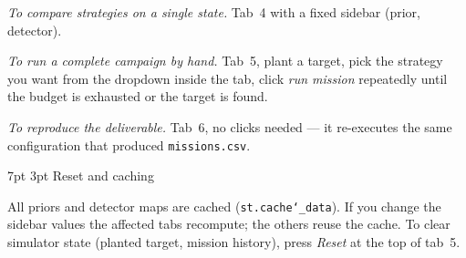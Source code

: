 \documentclass[11pt,a4paper]{article}
\makeatletter
\renewcommand\section{\@startsection{section}{1}{\z@}%
                                    {7pt \@plus 1pt \@minus 1pt}%
                                    {3pt}%
                                    {\normalfont\normalsize\bfseries}}
\makeatother
\begin{document}
\textit{To compare strategies on a single state.} Tab~4 with a fixed
sidebar (prior, detector).

\textit{To run a complete campaign by hand.} Tab~5, plant a target, pick
the strategy you want from the dropdown inside the tab, click \emph{run
mission} repeatedly until the budget is exhausted or the target is found.

\textit{To reproduce the deliverable.} Tab~6, no clicks needed --- it
re-executes the same configuration that produced \texttt{missions.csv}.

\section{Reset and caching}

All priors and detector maps are cached (\texttt{st.cache\char`_data}). If
you change the sidebar values the affected tabs recompute; the others reuse
the cache. To clear simulator state (planted target, mission history),
press \emph{Reset} at the top of tab~5.
\end{document}
